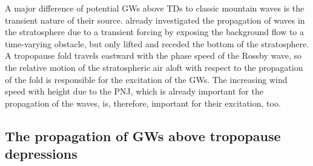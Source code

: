 A major difference of potential GWs above TDs to classic mountain waves is the transient nature of their source. \textcite{pfister_gravity_1993} already investigated the propagation of waves in the stratosphere due to a transient forcing by exposing the background flow to a time-varying obstacle, but only lifted and receded the bottom of the stratosphere. A tropopause fold travels eastward with the phase speed of the Rossby wave, so the relative motion of the stratospheric air aloft with respect to the propagation of the fold is responsible for the excitation of the GWs. The increasing wind speed with height due to the PNJ, which is already important for the propagation of the waves, is, therefore, important for their excitation, too.

\subsection{The propagation of GWs above tropopause depressions}
\label{sec:propagation}

